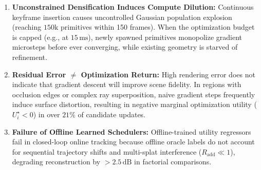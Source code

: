 \documentclass[10pt,twocolumn,letterpaper]{article}
\begin{document}
\begin{enumerate}
\setlength{\itemsep}{1pt}
\item \textbf{Unconstrained Densification Induces Compute Dilution:} Continuous keyframe insertion causes uncontrolled Gaussian population explosion (reaching $150\mathrm{k}$ primitives within 150 frames). When the optimization budget is capped (e.g., at $15\,\mathrm{ms}$), newly spawned primitives monopolize gradient microsteps before ever converging, while existing geometry is starved of refinement.
\item \textbf{Residual Error $\neq$ Optimization Return:} High rendering error does not indicate that gradient descent will improve scene fidelity. In regions with occlusion edges or complex ray superposition, naive gradient steps frequently induce surface distortion, resulting in negative marginal optimization utility ($U_i^\star < 0$) in over $21\%$ of candidate updates.
\item \textbf{Failure of Offline Learned Schedulers:} Offline-trained utility regressors fail in closed-loop online tracking because offline oracle labels do not account for sequential trajectory shifts and multi-splat interference ($R_{\mathrm{add}} \ll 1$), degrading reconstruction by $>2.5\,\mathrm{dB}$ in factorial comparisons.
\end{enumerate}
\end{document}

